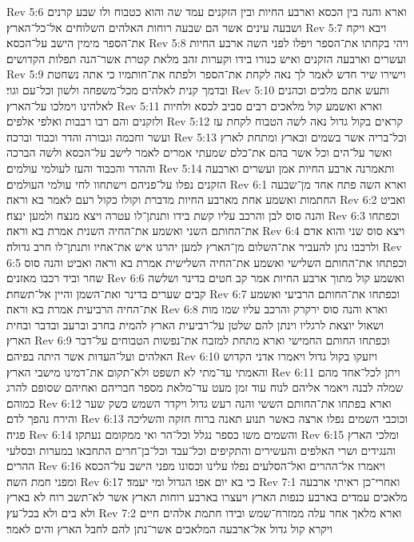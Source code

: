 Rev 5:6  וארא והנה בין הכסא וארבע החיות ובין הזקנים עמד שה והוא כטבוח ולו שבע קרנים ושבעה עינים אשר הם שבעה רוחות האלהים השלוחים אל־כל־הארץ׃
Rev 5:7  ויבא ויקח את־הספר מימין הישב על־הכסא׃
Rev 5:8  ויהי בקחתו את־הספר ויפלו לפני השה ארבע החיות ועשרים וארבעה הזקנים ואיש כנורו בידו וקערות זהב מלאת קטרת אשר־הנה תפלות הקדושים׃
Rev 5:9  וישירו שיר חדש לאמר לך נאה לקחת את־הספר ולפתח את־חותמיו כי אתה נשחטת ובדמך קנית לאלהים מכל־משפחה ולשון וכל־עם וגוי׃
Rev 5:10  ותעש אתם מלכים וכהנים לאלהינו וימלכו על־הארץ׃
Rev 5:11  וארא ואשמע קול מלאכים רבים סביב לכסא ולחיות ולזקנים והם רבו רבבות ואלפי אלפים׃
Rev 5:12  קראים בקול גדול נאה לשה הטבוח לקחת עז ועשר וחכמה וגבורה והדר וכבוד וברכה׃
Rev 5:13  וכל־בריה אשר בשמים ובארץ ומתחת לארץ ואשר על־הים וכל אשר בהם את־כלם שמעתי אמרים לאמר לישב על־הכסא ולשה הברכה וההדר והכבוד והעז לעולמי עולמים׃
Rev 5:14  ותאמרנה ארבע החיות אמן ועשרים וארבעה הזקנים נפלו על־פניהם וישתחוו לחי עולמי העולמים׃
Rev 6:1  וארא השה פתח אחד מן־שבעה החתמות ואשמע אחת מארבע החיות מדברת וקולו כקול רעם לאמר בא וראה׃
Rev 6:2  ואביט והנה סוס לבן והרכב עליו קשת בידו ותנתן־לו עטרה ויצא מנצח ולמען ינצח׃
Rev 6:3  וכפתחו את־החותם השני ואשמע את־החיה השנית אמרת בא וראה׃
Rev 6:4  ויצא סוס שני והוא אדם ולרכבו נתן להעביר את־השלום מן־הארץ למען יהרגו איש את־אחיו ותנתן־לו חרב גדולה׃
Rev 6:5  וכפתחו את־החותם השלישי ואשמע את־החיה השלישית אמרת בא וראה ואביט והנה סוס שחר וביד רכבו מאזנים׃
Rev 6:6  ואשמע קול מתוך ארבע החיות אמר קב חטים בדינר ושלשה קבים שערים בדינר ואת־השמן והיין אל־תשחת׃
Rev 6:7  וכפתחו את־החותם הרביעי ואשמע את־החיה הרביעית אמרת בא וראה׃
Rev 6:8  וארא והנה סוס ירקרק והרכב עליו שמו מות ושאול יוצאת לרגליו וינתן להם שלטן על־רביעית הארץ להמית בחרב וברעב ובדבר ובחית הארץ׃
Rev 6:9  וכפתחו החותם החמישי וארא מתחת למזבח את־נפשות הטבוחים על־דבר האלהים ועל־העדות אשר היתה בפיהם׃
Rev 6:10  ויזעקו בקול גדול ויאמרו אדני הקדוש והאמתי עד־מתי לא תשפט ולא־תקום את־דמינו מישבי הארץ׃
Rev 6:11  ויתן לכל־אחד מהם שמלה לבנה ויאמר אליהם לנוח עוד זמן מעט עד־מלאת מספר חבריהם ואחיהם שסופם להרג כמוהם׃
Rev 6:12  וארא בפתחו את־החותם הששי והנה רעש גדול ויקדר השמש כשק שער והירח נהפך לדם׃
Rev 6:13  וכוכבי השמים נפלו ארצה כאשר תנוע תאנה ברוח חזקה והשליכה פגיה׃
Rev 6:14  והשמים משו כספר נגלל וכל־הר ואי ממקומם נעתקו׃
Rev 6:15  ומלכי הארץ והנגידים ושרי האלפים והעשירים והתקיפים וכל־עבד וכל־בן־חרים התחבאו במערות ובסלעי ההרים׃
Rev 6:16  ויאמרו אל־ההרים ואל־הסלעים נפלו עלינו וכסונו מפני הישב על־הכסא ומפני חמת השה׃
Rev 6:17  כי בא יום אפו הגדול ומי יעמד׃
Rev 7:1  ואחרי־כן ראיתי ארבעה מלאכים עמדים בארבע כנפות הארץ ויעצרו בארבע רוחות הארץ אשר לא־תשב רוח לא בארץ ולא בים ולא בכל־עץ׃
Rev 7:2  וארא מלאך אחר עלה ממזרח־שמש ובידו חתמת אלהים חיים ויקרא קול גדול אל־ארבעה המלאכים אשר־נתן להם לחבל הארץ והים לאמר׃
